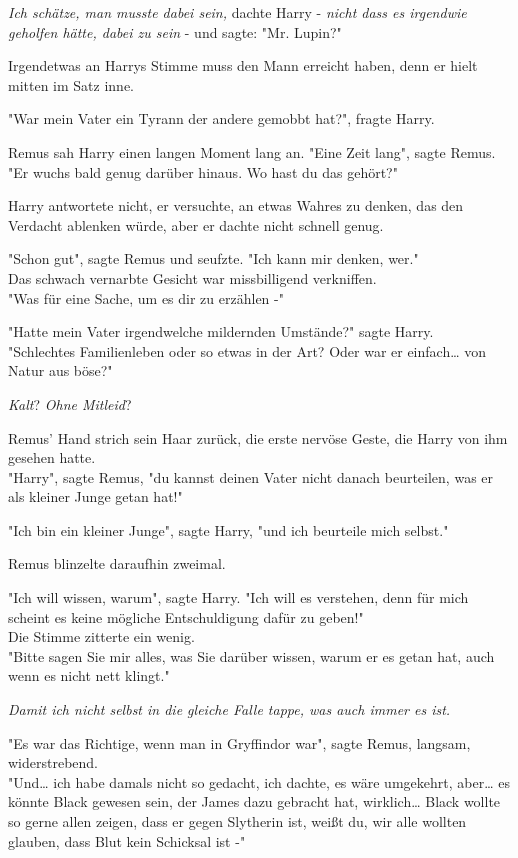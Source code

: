 {\emph{Ich schätze, man musste dabei sein,} dachte Harry - \emph{nicht dass es irgendwie geholfen hätte, dabei zu sein} - und sagte: "Mr. Lupin?"

Irgendetwas an Harrys Stimme muss den Mann erreicht haben, denn er hielt mitten im Satz inne.

"War mein Vater ein Tyrann der andere gemobbt hat?", fragte Harry.

Remus sah Harry einen langen Moment lang an. "Eine Zeit lang", sagte Remus.\\ "Er wuchs bald genug darüber hinaus. Wo hast du das gehört?"

Harry antwortete nicht, er versuchte, an etwas Wahres zu denken, das den Verdacht ablenken würde, aber er dachte nicht schnell genug.

"Schon gut", sagte Remus und seufzte. "Ich kann mir denken, wer."\\ Das schwach vernarbte Gesicht war missbilligend verkniffen.\\ "Was für eine Sache, um es dir zu erzählen -"

"Hatte mein Vater irgendwelche mildernden Umstände?" sagte Harry.\\ "Schlechtes Familienleben oder so etwas in der Art? Oder war er einfach… von Natur aus böse?"

\emph{Kalt}? \emph{Ohne Mitleid}?

Remus' Hand strich sein Haar zurück, die erste nervöse Geste, die Harry von ihm gesehen hatte.\\ "Harry", sagte Remus, "du kannst deinen Vater nicht danach beurteilen, was er als kleiner Junge getan hat!"

"Ich bin ein kleiner Junge", sagte Harry, "und ich beurteile mich selbst."

Remus blinzelte daraufhin zweimal.

"Ich will wissen, warum", sagte Harry. "Ich will es verstehen, denn für mich scheint es keine mögliche Entschuldigung dafür zu geben!"\\ Die Stimme zitterte ein wenig.\\ "Bitte sagen Sie mir alles, was Sie darüber wissen, warum er es getan hat, auch wenn es nicht nett klingt."

\emph{Damit ich nicht selbst in die gleiche Falle tappe, was auch immer es ist.}

"Es war das Richtige, wenn man in Gryffindor war", sagte Remus, langsam, widerstrebend.\\ "Und… ich habe damals nicht so gedacht, ich dachte, es wäre umgekehrt, aber… es könnte Black gewesen sein, der James dazu gebracht hat, wirklich… Black wollte so gerne allen zeigen, dass er gegen Slytherin ist, weißt du, wir alle wollten glauben, dass Blut kein Schicksal ist -"

}
